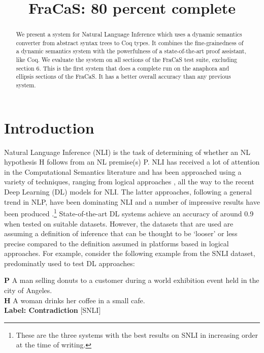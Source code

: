 \documentclass[11pt]{article}
\title{FraCaS: 80 percent complete}
\begin{document}
\maketitle{}

\begin{abstract}
  We present a system for Natural Language Inference which uses a
  dynamic semantics converter from abstract syntax trees to Coq
  types. It combines the fine-grainedness of a dynamic semantics
  system with the powerfulness of a state-of-the-art proof assistant,
  like Coq. We evaluate the system on all sections of the FraCaS test
  suite, excluding section 6. This is the first system that does a
  complete run on the anaphora and ellipsis sections of the FraCaS. It
  has a better overall accuracy than any previous system.
\end{abstract}
\section{Introduction}
Natural Language Inference (NLI) is the task of determining of whether
an NL hypothesis H follows from an NL premise(s) P. NLI has received a
lot of attention in the Computational Semantics literature and has
been approached using a variety of techniques, ranging from logical
approaches
\citep{bos:2008,Mineshima:2015,Abzianidze:2015,bernardy_type_2017},
all the way to the recent Deep Learning (DL) models for NLI. The
latter approaches, following a general trend in NLP, have been
dominating NLI and a number of impressive results have been
produced \citep{kim:2018,radford:2018,liu:2019}.\footnote{These are
  the three systems with the best results on SNLI in increasing
  order at the time of writing.}  State-of-the-art DL systems achieve an accuracy of around
0.9 when tested on suitable datasets. However, the datasets that are
used are assuming a definition of inference that can be thought to be
`looser' or less precise compared to the definition assumed in
platforms based in logical approaches. For example, consider the following
 example  from the SNLI dataset, predominatly used to test DL
approaches:
%
\begin{lingex}
\item %
  \label{ex:snli}
\textbf{P}  A  man selling donuts to a customer during a world
exhibition event held in the city of Angeles. \\
 \textbf{H}  A woman drinks her coffee in a small cafe.\\
\textbf{Label: Contradiction} [SNLI]
\end{lingex}
\end{document}
